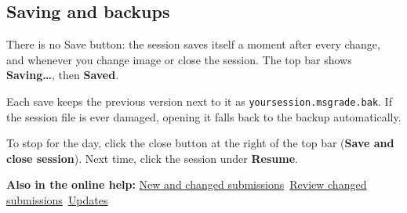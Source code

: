 \tocoff
\subsection{Saving and backups}\label{sec:getting-started:saving-and-backups}
\tocon

There is no Save button: the session saves itself a moment after every change, and whenever you change image or close the session. The top bar shows \textbf{Saving\ldots{}}, then \textbf{\checksym{} Saved}.

Each save keeps the previous version next to it as \texttt{yoursession.msgrade.bak}. If the session file is ever damaged, opening it falls back to the backup automatically.

To stop for the day, click the close button at the right of the top bar (\textbf{Save and close session}). Next time, click the session under \textbf{Resume}.

{\small\textbf{Also in the online help:} \href{https://github.com/agadin/micro-speed-grader/blob/main/docs/help/getting-started.md\#new-and-changed-submissions}{New and changed submissions}\,\onlinemark{} \textperiodcentered{} \href{https://github.com/agadin/micro-speed-grader/blob/main/docs/help/getting-started.md\#review-changed-submissions}{Review changed submissions}\,\onlinemark{} \textperiodcentered{} \href{https://github.com/agadin/micro-speed-grader/blob/main/docs/help/getting-started.md\#updates}{Updates}\,\onlinemark{}}
